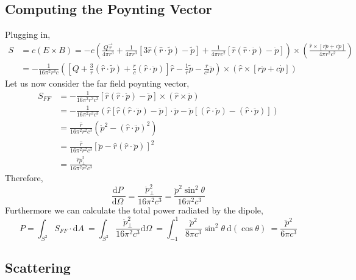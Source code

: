 \documentclass[12pt]{extarticle}
\renewcommand{\d}[1]{ \mathrm{d}#1 \:}
\newcommand{\deriv}[2]{\frac{\d{#1}}{\d{#2}}}
\theoremstyle{definition}
\begin{document}
\subsection{Computing the Poynting Vector}

Plugging in,
\begin{align*}
S & = c(E \times B) = - c \left( \frac{Q \vec{r}}{4 \pi r^3} + \frac{1}{4 \pi r^3} [3 \hat{r} (\hat{r} \cdot \tilde{p}) - \tilde{p}] + \frac{1}{4 \pi r c^2} [ \hat{r} (\hat{r} \cdot \ddot{p}) - \ddot{p} ] \right) \times \left( \frac{\hat{r} \times  [r \ddot{p} + c \dot{p}]}{4 \pi r^2 c^2} \right) 
\\
& = -\frac{1}{16 \pi^2 r^4 c} \left( \left[ Q +  \frac{3}{r}  (\hat{r} \cdot \tilde{p})  + \frac{r}{c} (\hat{r} \cdot \ddot{p}) \right]  \hat{r} - \frac{1}{r}  \tilde{p} - \frac{r}{c^2}  \ddot{p}  \right) \times \left( \hat{r} \times  [r \ddot{p} + c \dot{p}] \right) 
\end{align*} 
Let us now consider the far field poynting vector,
\begin{align*}
S_{FF} & = -\frac{1}{16 \pi^2 r^3 c^3} \left[ \hat{r} (\hat{r} \cdot \ddot{p}) - \ddot{p} \right] \times  \left( \hat{r} \times  \ddot{p} \right)
\\
& = -\frac{1}{16 \pi^2 r^3 c^3} \left( \hat{r} [\hat{r} (\hat{r} \cdot \ddot{p}) - \ddot{p}] \cdot \ddot{p}  - \ddot{p}  [(\hat{r} \cdot \ddot{p}) - (\hat{r} \cdot \ddot{p}) ] \right)
\\
& = \frac{\hat{r}}{16 \pi^2 r^2 c^3} \left( \ddot{p}^2  - (\hat{r} \cdot \ddot{p})^2  \right)
\\
& = \frac{\hat{r}}{16 \pi^2 r^2 c^3} \left[ \ddot{p} - \hat{r} (\hat{r} \cdot \ddot{p}) \right]^2
\\
& = \frac{\hat{r} \ddot{p}_\perp^2}{16 \pi^2 r^2 c^3} 
\end{align*}
Therefore,
\[ \deriv{P}{\Omega} = \frac{\ddot{p}_\perp^2}{16 \pi^2 c^3} = \frac{\ddot{p}^2 \sin^2{\theta}}{16 \pi^2 c^3}  \]
Furthermore we can calculate the total power radiated by the dipole,
\[ P = \int_{S^2} S_{FF} \cdot \d{A} = \int_{S^2} \frac{\ddot{p}_\perp^2}{16 \pi^2 c^3} \d{\Omega} = \int_{-1}^1 \frac{\ddot{p}^2}{8 \pi c^3} \sin^2{\theta} \: \d{(\cos{\theta})} = \frac{\ddot{p}^2}{6 \pi c^3} \]

\subsection{Scattering}
\end{document}
